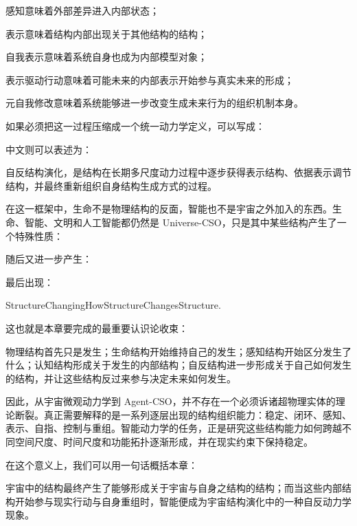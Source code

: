 感知意味着外部差异进入内部状态；

表示意味着结构内部出现关于其他结构的结构；

自我表示意味着系统自身也成为内部模型对象；

表示驱动行动意味着可能未来的内部表示开始参与真实未来的形成；

元自我修改意味着系统能够进一步改变生成未来行为的组织机制本身。

如果必须把这一过程压缩成一个统一动力学定义，可以写成：
\begin{statementbox}
\centering
{}
\end{statementbox}

中文则可以表述为：

\begin{statementbox}
自反结构演化，是结构在长期多尺度动力过程中逐步获得表示结构、依据表示调节结构，并最终重新组织自身结构生成方式的过程。
\end{statementbox}

在这一框架中，生命不是物理结构的反面，智能也不是宇宙之外加入的东西。生命、智能、文明和人工智能都仍然是 Universe-CSO，只是其中某些结构产生了一个特殊性质：
\begin{statementbox}
\centering
{}
\end{statementbox}
随后又进一步产生：
\begin{statementbox}
\centering
{}
\end{statementbox}
最后出现：
\begin{statementbox}
StructureChangingHowStructureChangesStructure.
\end{statementbox}

这也就是本章要完成的最重要认识论收束：

\begin{conclusion}
物理结构首先只是发生；生命结构开始维持自己的发生；感知结构开始区分发生了什么；认知结构形成关于发生的内部结构；自反结构进一步形成关于自己如何发生的结构，并让这些结构反过来参与决定未来如何发生。
\end{conclusion}

因此，从宇宙微观动力学到 Agent-CSO，并不存在一个必须诉诸超物理实体的理论断裂。真正需要解释的是一系列逐层出现的结构组织能力：稳定、闭环、感知、表示、自指、控制与重组。智能动力学的任务，正是研究这些结构能力如何跨越不同空间尺度、时间尺度和功能拓扑逐渐形成，并在现实约束下保持稳定。

在这个意义上，我们可以用一句话概括本章：

\begin{conclusion}
宇宙中的结构最终产生了能够形成关于宇宙与自身之结构的结构；而当这些内部结构开始参与现实行动与自身重组时，智能便成为宇宙结构演化中的一种自反动力学现象。
\end{conclusion}
